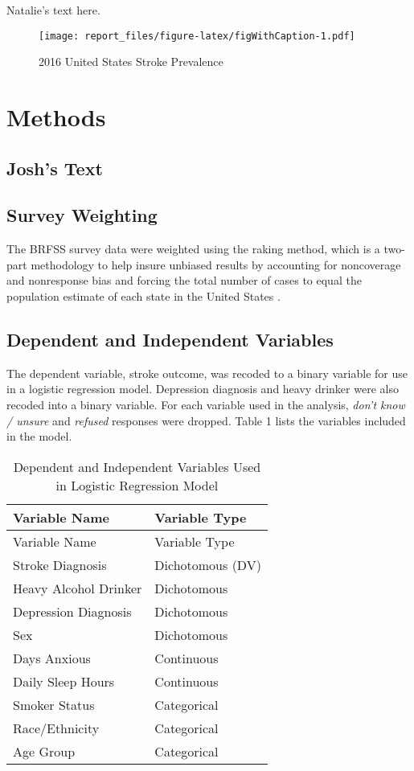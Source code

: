 \documentclass[11pt,]{article}
\begin{document}
Natalie's text here.

\begin{figure}
\centering
\texttt{[image: report\_files/figure-latex/figWithCaption-1.pdf]}
\caption{2016 United States Stroke Prevalence}
\end{figure}

\section{Methods}\label{methods}

\subsection{Josh's Text}\label{joshs-text}

\subsection{Survey Weighting}\label{survey-weighting}

The BRFSS survey data were weighted using the raking method, which is a
two-part methodology to help insure unbiased results by accounting for
noncoverage and nonresponse bias and forcing the total number of cases
to equal the population estimate of each state in the United States
\citep{CentersforDiseaseControlandPrevention2007}.

\subsection{Dependent and Independent
Variables}\label{dependent-and-independent-variables}

The dependent variable, stroke outcome, was recoded to a binary variable
for use in a logistic regression model. Depression diagnosis and heavy
drinker were also recoded into a binary variable. For each variable used
in the analysis, \emph{don't know / unsure} and \emph{refused} responses
were dropped. Table 1 lists the variables included in the model.

\begin{longtable}[]{@{}ll@{}}
\caption{Dependent and Independent Variables Used in Logistic Regression
Model}\tabularnewline
\toprule
Variable Name & Variable Type\tabularnewline
\midrule
\endfirsthead
\toprule
Variable Name & Variable Type\tabularnewline
\midrule
\endhead
Stroke Diagnosis & Dichotomous (DV)\tabularnewline
Heavy Alcohol Drinker & Dichotomous\tabularnewline
Depression Diagnosis & Dichotomous\tabularnewline
Sex & Dichotomous\tabularnewline
Days Anxious & Continuous\tabularnewline
Daily Sleep Hours & Continuous\tabularnewline
Smoker Status & Categorical\tabularnewline
Race/Ethnicity & Categorical\tabularnewline
Age Group & Categorical\tabularnewline
\bottomrule
\end{longtable}
\end{document}
